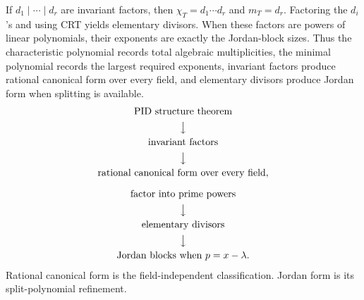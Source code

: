 \begin{remark}
If \(d_1\mid\cdots\mid d_r\) are invariant factors, then
\(\chi_T=d_1\cdots d_r\) and \(m_T=d_r\). Factoring the \(d_i\)'s and
using CRT yields elementary divisors. When these factors are powers of linear
polynomials, their exponents are exactly the Jordan-block sizes. Thus the
characteristic polynomial records total algebraic multiplicities, the minimal
polynomial records the largest required exponents, invariant factors produce
rational canonical form over every field, and elementary divisors produce
Jordan form when splitting is available.
\[
\begin{gathered}
\text{PID structure theorem}\\
\big\downarrow\\
\text{invariant factors}\\
\big\downarrow\\
\text{rational canonical form over every field},\\[1.5ex]
\text{factor into prime powers}\\
\big\downarrow\\
\text{elementary divisors}\\
\big\downarrow\\
\text{Jordan blocks when }p=x-\lambda.
\end{gathered}
\]
Rational canonical form is the field-independent classification.  Jordan
form is its split-polynomial refinement.
\end{remark}
\fi



